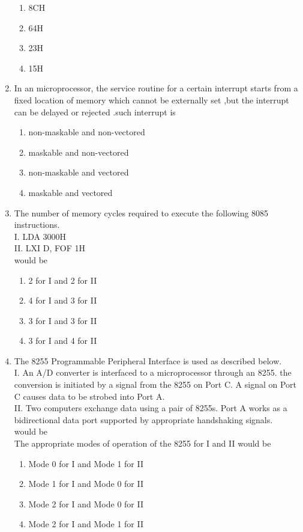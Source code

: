 \documentclass[journal,12pt,twocolumn]{IEEEtran}
\begin{document}
\begin{enumerate}
\begin{enumerate} 
      \item 8CH
      \item 64H
      \item 23H
      \item 15H
    \end{enumerate}
 \item In an microprocessor, the service routine for a certain interrupt  starts from a fixed location of memory which cannot be externally set ,but the interrupt can be delayed or rejected .such interrupt is
\begin{enumerate}
      \item non-maskable  and non-vectored
      \item maskable and non-vectored
      \item non-maskable and vectored
      \item maskable and vectored
    \end{enumerate}
\item The number of memory cycles required to execute the following 8085 instructions.\\
I. LDA 3000H\\
II. LXI D, FOF 1H\\
would be  \\
   \begin{enumerate}
      \item 2 for I and 2 for II
      \item 4 for I and 3 for II
      \item 3 for I and 3 for II
      \item 3 for I and 4 for II
    \end{enumerate}
\item The 8255 Programmable Peripheral Interface is used as described below.\\
I. An A/D converter is interfaced to a microprocessor through an 8255. the
conversion is initiated by a signal from the 8255 on Port C. A signal on Port C
causes data to be strobed into Port A.\\
II. Two computers exchange data using a pair of 8255s. Port A works as a bidirectional data port supported by appropriate handshaking signals.\\
would be  \\
The appropriate modes of operation of the 8255 for I and II would be\\
    \begin{enumerate}
      \item Mode 0 for I and Mode 1 for II
      \item Mode 1 for I and Mode 0 for II
      \item Mode 2 for I and Mode 0 for II
      \item Mode 2 for I and Mode 1 for II
    \end{enumerate}


\end{enumerate}
\end{document}
